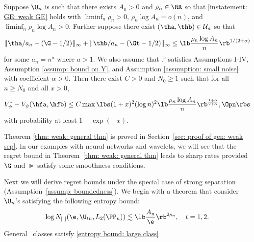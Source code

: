 \documentclass[preprint] {imsart}
\begin{document}
 \begin{theorem}
\label{thm: weak: general thm}
Suppose $\U_n$  is such that  there exists $A_n>0$ and $\rho_n\in\RR$ so that  \eqref{instatement: GE: weak GE} holds with $\liminf_n\rho_n>0$, $\rho_n\log A_n=o(n)$, and  $\liminf_n\rho_n\log A_n>0$. 
Further suppose there exist $(\tha,\thb)\in\mathcal U_n$
so that
\begin{equation}\label{instatement: GE: weak: approx}
    \|\tha/a_n-(\G-1/2)\|_\infty+\|\thb/a_n-(\Gt-1/2)\|_\infty\leq \lb \frac{\rho_n\log A_n}{n}\rb^{1/(2+\alpha)}
\end{equation}
for some $a_n=n^a$ where $a>1$.
We also assume that $\mathbb P$ satisfies Assumptions I-IV, Assumption \ref{assump: bound on Y}, and Assumption \ref{assumption: small noise} with coefficient $\alpha>0$. Then there exist $C>0$  and $N_0\geq 1$ such that for all $n\geq N_0$ and all $x>0$,
\[V_\psi^*-V_\psi(\hfa,\hfb)\leq  C\max\lbs (1+x)^2 (\log n)^2 \lb \frac{\rho_n\log A_n}{n}\rb^{\frac{1+\alpha}{2+\alpha}},\Opn\rbs\]
with probability at least $1-\exp(-x)$.
\end{theorem}
Theorem \ref{thm: weak: general thm} is proved in Section~\ref{sec: proof of gen: weak sep}. 
In our examples with neural networks and wavelets, we will see that the regret bound in Theorem~\ref{thm: weak: general thm} leads to sharp rates provided $\G$ and $\Gt$ satisfy some smoothness conditions. 

Next we will derive  regret bounds under the special case of strong separation (Assumption~\ref{assump: boundedness}). We begin with a theorem that consider $\U_n$'s satisfying the following entropy bound:
\begin{align}\label{entropy bound: large class}
    \log N_{[\ ]}(\e,\U_{tn}, L_2(\PP_n))\lesssim \lb\frac{A_{n}}{\e}\rb^{2\rho_n},\quad t=1,2.
\end{align}
General \Holder\ classes satisfy \eqref{entropy bound: large class} \citep[cf. p.154,][]{wc}.
\end{document}
